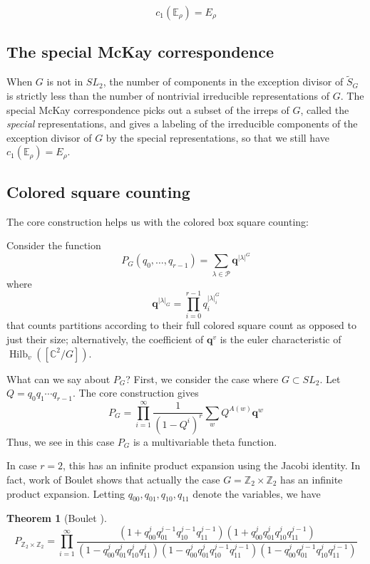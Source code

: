 \documentclass{amsart}[12pt]
\theoremstyle{definition}
\newtheorem{theorem}[dummy]{Theorem}
\newcommand{\Z}{\mathbb{Z}}
\newcommand{\C}{\mathbb{C}}
\DeclareMathOperator{\Hilb}{Hilb}
\begin{document}
$$c_1(\mathbb{E}_\rho)=E_\rho$$

\subsection{The special McKay correspondence}

When $G$ is not in $SL_2$, the number of components in the exception divisor of $\widetilde{S}_G$ is strictly less than the number of nontrivial irreducible representations of $G$.  The special McKay correspondence picks out a subset of the irreps of $G$, called the \emph{special} representations, and gives a labeling of the irreducible components of the exception divisor of $G$ by the special representations, so that we still have $c_1(\mathbb{E}_\rho)=E_\rho$.


\subsection{Colored square counting}

The core construction helps us with the colored box square counting:

Consider the function
$$P_G(q_0,\dots,q_{r-1})=\sum_{\lambda\in\mathcal{P}} \mathbf{q}^{|\lambda|^G}$$
where 
$$\mathbf{q}^{|\lambda|_G}=\prod_{i=0}^{r-1} q_i^{|\lambda|^G_i}$$
that counts partitions according to their full colored square count as opposed to just their size; alternatively, the coefficient of $\mathbf{q}^v$ is the euler characteristic of $\Hilb_v([\C^2/G])$.

What can we say about $P_G$?  First, we consider the case where $G\subset SL_2$.  Let $Q=q_0q_1\cdots q_{r-1}$.  The core construction gives
$$P_G=\prod_{i=1}^\infty\frac{1}{(1-Q^i)^r} \sum_{w} Q^{A(w)}\mathbf{q}^w $$
Thus, we see in this case $P_G$ is a multivariable theta function.

In case $r=2$, this has an infinite product expansion using the Jacobi identity.  In fact, work of Boulet shows that actually the case $G=\Z_2\times \Z_2$ has an infinite product expansion.  Letting $q_{00}, q_{01}, q_{10}, q_{11}$ denote the variables, we have

\begin{theorem}[Boulet \cite{boulet}]
$$P_{\Z_2\times\Z_2}=\prod_{i=1}^\infty \frac{(1+q_{00}^jq_{01}^{j-1}q_{10}^{j-1}q_{11}^{j-1})(1+q_{00}^jq_{01}^jq_{10}^jq_{11}^{j-1})}{(1-q_{00}^jq_{01}^jq_{10}^jq_{11}^j)(1-q_{00}^jq_{01}^jq_{10}^{j-1}q_{11}^{j-1})(1-q_{00}^jq_{01}^{j-1}q_{10}^{j}q_{11}^{j-1})}$$
\end{theorem}
\end{document}
